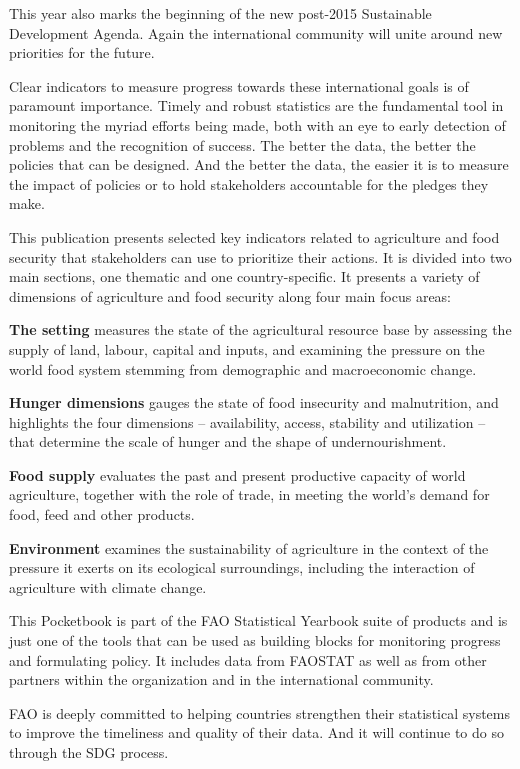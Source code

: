 \documentclass[twoside,web]{faofactbook}
\begin{document}
This year also marks the beginning of the new post-2015 Sustainable Development Agenda. Again the international community will unite around new priorities for the future.

Clear indicators to measure progress towards these international goals is of paramount importance. Timely and robust statistics are the fundamental tool in monitoring the myriad efforts being made, both with an eye to early detection of problems and the recognition of success. The better the data, the better the policies that can be designed. And the better the data, the easier it is to measure the impact of policies or to hold stakeholders accountable for the pledges they make. 

This publication presents selected key indicators related to agriculture and food security that stakeholders can use to prioritize their actions. It is divided into two main sections, one thematic and one country-specific. It presents a variety of dimensions of agriculture and food security along four main focus areas:


{\textbf{\color{Part1} The setting}} measures the state of the agricultural resource base by assessing the supply of land, labour, capital and inputs, and examining the pressure on the world food system stemming from demographic and macroeconomic change.

{\textbf{\color{Part2} Hunger dimensions}} gauges the state of food insecurity and malnutrition, and highlights the four dimensions – availability, access, stability and utilization – that determine the scale of hunger and the shape of undernourishment.

{\textbf{\color{Part3} Food supply}} evaluates the past and present productive capacity of world agriculture, together with the role of trade, in meeting the world’s demand for food, feed and other products.

{\textbf{\color{Part4} Environment}} examines the sustainability of agriculture in the context of the pressure it exerts on its ecological surroundings, including the interaction of agriculture with climate change.

This Pocketbook is part of the FAO Statistical Yearbook suite of products and is just one of the tools that can be used as building blocks for monitoring progress and formulating policy. It includes data from FAOSTAT as well as from other partners within the organization and in the international community. 

FAO is deeply committed to helping countries strengthen their statistical systems to improve the timeliness and quality of their data. And it will continue to do so through the SDG process.
\end{document}
